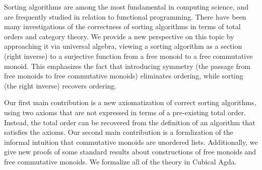 Sorting algorithms are among the most fundamental in computing science, and are frequently studied in relation to functional programming. There have been many investigations of the correctness of sorting algorithms in terms of total orders and category theory. We provide a new perspective on this topic by approaching it via universal algebra, viewing a sorting algorithm as a section (right inverse) to a surjective function from a free monoid to a free commutative monoid. This emphasizes the fact that introducing symmetry (the passage from free monoids to free commutative monoids) eliminates ordering, while sorting (the right inverse) recovers ordering.

Our first main contribution is a new axiomatization of correct sorting algorithms, using two axioms that are not expressed in terms of a pre-existing total order. Instead, the total order can be recovered from the definition of an algorithm that satisfies the axioms. Our second main contribution is a formlization of the informal intuition that commutative monoids are unordered lists. Additionally, we give new proofs of some standard results about constructions of free monoids and free commutative monoids. We formalize all of the theory in Cubical Agda.  





%
